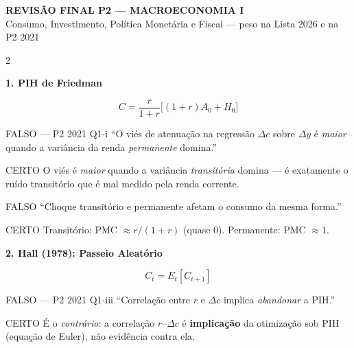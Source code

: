 \documentclass[10pt, a4paper]{article}
\begin{document}
\begin{center}
{\large\bfseries\color{azul} REVISÃO FINAL P2 --- MACROECONOMIA I}\\
{\small\color{cinza} Consumo, Investimento, Política Monetária e Fiscal --- peso na Lista 2026 e na P2 2021}
\end{center}

\vspace{0.3em}
\begin{multicols}{2}

\textbf{\color{azul}\large 1. PIH de Friedman}

\begin{formulabox}
\[C = \frac{r}{1+r}\bigl[(1+r)A_0 + H_0\bigr]\]
\end{formulabox}

\begin{errobox}{FALSO --- P2 2021 Q1-i}
``O viés de atenuação na regressão $\Delta c$ sobre $\Delta y$ é \emph{maior}
quando a variância da renda \emph{permanente} domina.''
\end{errobox}
\vspace{0.3em}
\begin{certobox}{CERTO}
O viés é \emph{maior} quando a variância \emph{transitória} domina --- é
exatamente o ruído transitório que é mal medido pela renda corrente.
\end{certobox}

\begin{errobox}{FALSO}
``Choque transitório e permanente afetam o consumo da mesma forma.''
\end{errobox}
\vspace{0.3em}
\begin{certobox}{CERTO}
Transitório: PMC $\approx r/(1+r)$ (quase 0). Permanente: PMC $\approx 1$.
\end{certobox}

\vspace{0.5em}
\textbf{\color{azul}\large 2. Hall (1978): Passeio Aleatório}

\begin{formulabox}
\[C_t = E_t[C_{t+1}]\]
\end{formulabox}

\begin{errobox}{FALSO --- P2 2021 Q1-iii}
``Correlação entre $r$ e $\Delta c$ implica \emph{abandonar} a PIH.''
\end{errobox}
\vspace{0.3em}
\begin{certobox}{CERTO}
É o \emph{contrário}: a correlação $r$--$\Delta c$ é \textbf{implicação} da
otimização sob PIH (equação de Euler), não evidência contra ela.
\end{certobox}


\end{multicols}
\end{document}
